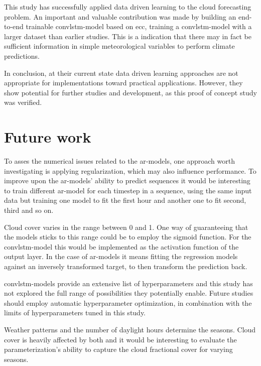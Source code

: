 This study has successfully applied data driven learning to the cloud forecasting problem. An important and valuable contribution was made by building an end-to-end trainable \acrshort{convlstm}-model based on \acrshort{ecc}, training a \acrshort{convlstm}-model with a larger dataset than earlier studies. This is a indication that there may in fact be sufficient information in simple meteorological variables to perform climate predictions. 

In conclusion, at their current state data driven learning approaches are not appropriate for implementations toward practical applications. However, they show potential for further studies and development, as this proof of concept study was verified.

\section{Future work}
To asses the numerical issues related to the \acrshort{ar}-models, one approach worth investigating is applying regularization, which may also influence performance. To improve upon the \acrshort{ar}-models' ability to predict sequences it would be interesting to train different \acrshort{ar}-model for each timestep in a sequence, using the same input data but training one model to fit the first hour and another one to fit second, third and so on.

Cloud cover varies in the range between 0 and 1. One way of guaranteeing that the models sticks to this range could be to employ the sigmoid function. For the \acrshort{convlstm}-model this would be implemented as the activation function of the output layer. In the case of \acrshort{ar}-models it means fitting the regression models against an inversely transformed target, to then transform the prediction back.

\acrshort{convlstm}-models provide an extensive list of hyperparameters and this study has not explored the full range of possibilities they potentially enable. Future studies should employ automatic hyperparameter optimization, in combination with the limits of hyperparameters tuned in this study.  

Weather patterns and the number of daylight hours determine the seasons. Cloud cover is heavily affected by both and it would be interesting to evaluate the parameterization's ability to capture the cloud fractional cover for varying seasons. 

